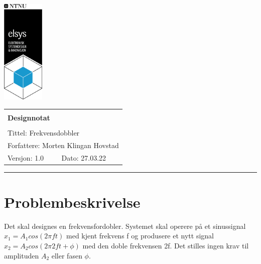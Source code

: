 \documentclass[a4paper,11pt,norsk]{article}
\begin{document}
\begin{minipage}[c]{0.15\textwidth}
\includegraphics[width=2.0cm]{elsys_pos_staaende_ntnu}  
\end{minipage}
\begin{minipage}[c]{0.85\textwidth}

\renewcommand{\arraystretch}{1.7}
\large 
\begin{tabularx}{\textwidth}{|X|X|}
\hline
\multicolumn{2}{|l|}{} \\
\multicolumn{2}{|l|}{\huge \textbf{Designnotat}} \\
\multicolumn{2}{|l|}{}  \\
\hline
\multicolumn{2}{|l|}{Tittel: 
Frekvensdobbler
} \\
\hline
\multicolumn{2}{|l|}{Forfattere: 
Morten Klingan Hovstad
} \\
\hline
Versjon: 1.0 & Dato: 27.03.22
\\
\hline 
\end{tabularx}
\end{minipage}
\normalsize


\setlength{\parskip}{0ex}
\renewcommand{\baselinestretch}{0.1}\normalsize
\tableofcontents
\renewcommand{\baselinestretch}{1.00}\normalsize
\setlength{\parskip}{2ex}
\rule{\textwidth}{1pt}

\section{Problembeskrivelse}
\label{sec:innledning}

Det skal designes en frekvensfordobler. Systemet skal operere på et sinussignal $x_1 = A_1 cos(2πft)$ med kjent frekvens f og produsere et nytt signal $x_2 = A_2 cos(2\pi2f t+\phi)$ med den doble frekvensen 2f. Det stilles ingen krav til amplituden $A_2$ eller fasen $\phi$.
\end{document}
